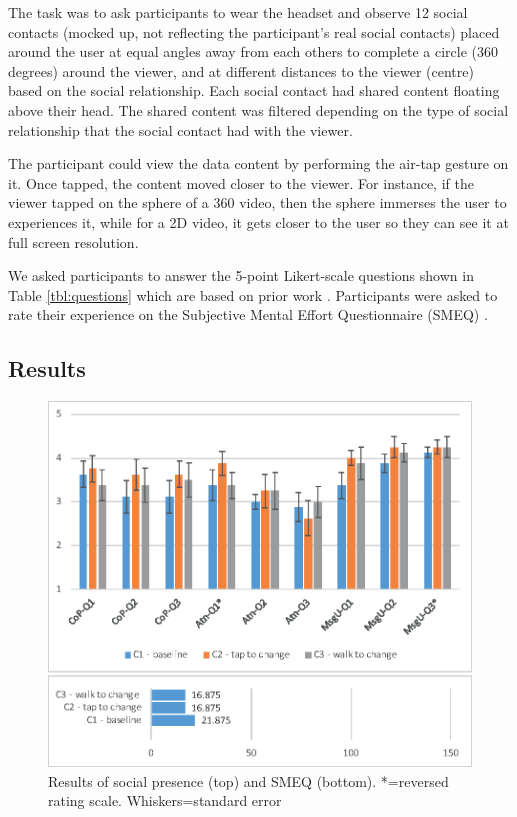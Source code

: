 The task was to ask participants to wear the headset and observe 12 social contacts (mocked up, not reflecting the participant's real social contacts) placed around the user at equal angles away from each others to complete a circle (360 degrees) around the viewer, and at different distances to the viewer (centre)  based on the social relationship. 
Each social contact had shared content floating above their head. The shared content was filtered depending on the type of social relationship that the social contact had with the viewer. 

The participant could view the data content by performing the air-tap gesture on it. Once tapped, the content moved closer to the viewer. For instance, if the viewer tapped on the sphere of a 360 video, then the sphere immerses the user to experiences it, while for a 2D video, it gets closer to the user so they can see it at full screen resolution.

We asked participants to answer the 5-point Likert-scale questions shown in Table \ref{tbl:questions} which are based on prior work \cite{Biocca2003}. Participants were asked to rate their experience on the Subjective Mental Effort Questionnaire (SMEQ) \cite{Sauro2009}. 

\subsection{Results}

\begin{figure}[h]
  \centering
  \includegraphics[width=\columnwidth]{images/chi/images-01.eps}
  \caption{Results of social presence (top) and SMEQ (bottom). *=reversed rating scale. Whiskers=standard error}
  \label{fig:data:results}
\end{figure}

